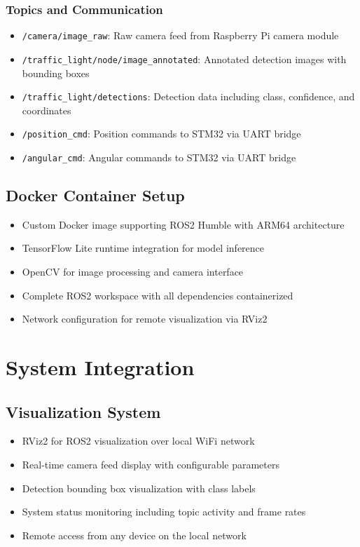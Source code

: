 \documentclass[12pt,a4paper]{article}
\begin{document}
	\subsubsection{Topics and Communication}
	\begin{itemize}
		\item \texttt{/camera/image\_raw}: Raw camera feed from Raspberry Pi camera module
		\item \texttt{/traffic\_light/node/image\_annotated}: Annotated detection images with bounding boxes
		\item \texttt{/traffic\_light/detections}: Detection data including class, confidence, and coordinates
		\item \texttt{/position\_cmd}: Position commands to STM32 via UART bridge
		\item \texttt{/angular\_cmd}: Angular commands to STM32 via UART bridge
	\end{itemize}
	
	\subsection{Docker Container Setup}
	\begin{itemize}
		\item Custom Docker image supporting ROS2 Humble with ARM64 architecture
		\item TensorFlow Lite runtime integration for model inference
		\item OpenCV for image processing and camera interface
		\item Complete ROS2 workspace with all dependencies containerized
		\item Network configuration for remote visualization via RViz2
	\end{itemize}
	
	\section{System Integration}
	
	\subsection{Visualization System}
	\begin{itemize}
		\item RViz2 for ROS2 visualization over local WiFi network
		\item Real-time camera feed display with configurable parameters
		\item Detection bounding box visualization with class labels
		\item System status monitoring including topic activity and frame rates
		\item Remote access from any device on the local network
	\end{itemize}
	
\end{document}
